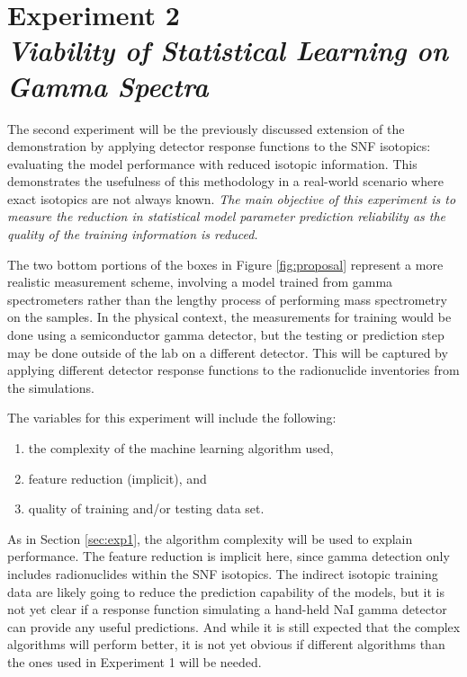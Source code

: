 \section[Experiment 2: Gamma Spectra]{Experiment 2\\ 
\large{\textit{Viability of Statistical Learning on Gamma Spectra}}}
\label{sec:exp2}

The second experiment will be the previously discussed extension of the
demonstration by applying detector response functions to the \gls{SNF}
isotopics: evaluating the model performance with reduced isotopic information.
This demonstrates the usefulness of this methodology in a real-world scenario
where exact isotopics are not always known.   \textit{The main objective of
this experiment is to measure the reduction in statistical model parameter
prediction reliability as the quality of the training information is reduced.}

The two bottom portions of the boxes in Figure \ref{fig:proposal} represent a
more realistic measurement scheme, involving a model trained from gamma
spectrometers rather than the lengthy process of performing mass spectrometry
on the samples.  In the physical context, the measurements for training would
be done using a semiconductor gamma detector, but the testing or prediction
step may be done outside of the lab on a different detector.  This will be
captured by applying different detector response functions to the radionuclide
inventories from the simulations.

The variables for this experiment will include the following:
\begin{enumerate}
  \itemsep-0.75em
  \item the complexity of the machine learning algorithm used, 
  \item feature reduction (implicit), and 
  \item quality of training and/or testing data set.
\end{enumerate}
As in Section \ref{sec:exp1}, the algorithm complexity will be used to explain
performance.  The feature reduction is implicit here, since gamma detection
only includes radionuclides within the \gls{SNF} isotopics. The indirect
isotopic training data are likely going to reduce the prediction capability of
the models, but it is not yet clear if a response function simulating a
hand-held NaI gamma detector can provide any useful predictions.  And while it
is still expected that the complex algorithms will perform better, it is not
yet obvious if different algorithms than the ones used in Experiment 1 will be
needed. 

